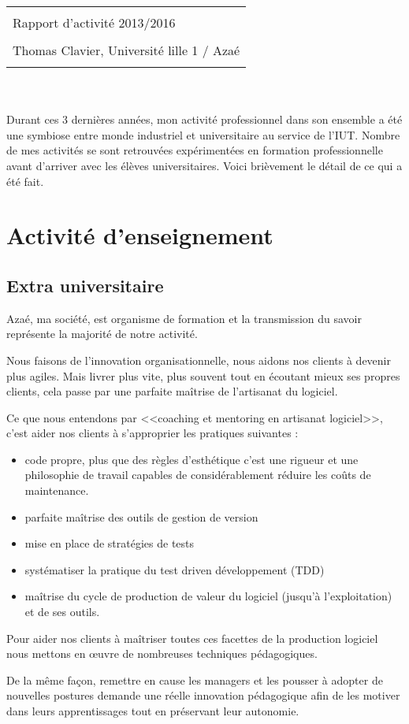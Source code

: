 \documentclass[a4paper]{article}
\title{
  \begin{tabularx}{\linewidth}{l}
    \hline\hline
    \\
    \Huge Rapport d’activité 2013/2016 \\
    \\
    \Large Thomas Clavier, \normalsize Université lille 1 / Azaé \\
    \\
    \hline\hline
  \end{tabularx}
}
\author{}
\date{}
\begin{document}
\maketitle

Durant ces 3 dernières années, mon activité professionnel dans son ensemble a été une symbiose entre monde industriel et universitaire au service de l'IUT. 
Nombre de mes activités se sont retrouvées expérimentées en formation professionnelle avant d'arriver avec les élèves universitaires.
Voici brièvement le détail de ce qui a été fait.

\section{Activité d'enseignement}
\subsection{Extra universitaire}
Azaé, ma société, est organisme de formation et la transmission du savoir représente la majorité de notre activité.

Nous faisons de l'innovation organisationnelle, nous aidons nos clients à devenir plus agiles. Mais livrer plus vite, plus souvent tout en écoutant mieux ses propres clients, cela passe par une parfaite maîtrise de l'artisanat du logiciel.

Ce que nous entendons par <<coaching et mentoring en artisanat logiciel>>, c'est aider nos clients à s'approprier les pratiques suivantes : 
\begin{itemize}
  \item code propre, plus que des règles d'esthétique c'est une rigueur et une philosophie de travail capables de considérablement réduire les coûts de maintenance.
  \item parfaite maîtrise des outils de gestion de version
  \item mise en place de stratégies de tests 
  \item systématiser la pratique du test driven développement (TDD)
  \item maîtrise du cycle de production de valeur du logiciel (jusqu'à l'exploitation) et de ses outils.
\end{itemize}

Pour aider nos clients à maîtriser toutes ces facettes de la production logiciel nous mettons en œuvre de nombreuses techniques pédagogiques.

De la même façon, remettre en cause les managers et les pousser à adopter de nouvelles postures demande une réelle innovation pédagogique afin de les motiver dans leurs apprentissages tout en préservant leur autonomie. 
\end{document}
